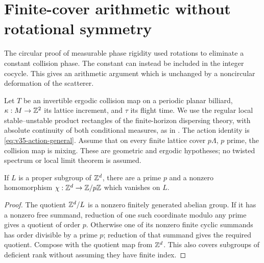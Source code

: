 \section{Finite-cover arithmetic without rotational symmetry}
\label{sec:rotation-free-arithmetic}
The circular proof of measurable phase rigidity used rotations to
eliminate a constant collision phase. The constant can instead be
included in the integer cocycle. This gives an arithmetic argument
which is unchanged by a noncircular deformation of the scatterer.

Let $T$ be an invertible ergodic collision map on a periodic planar
billiard, $\kappa:M\to\mathbb Z^2$ its lattice increment, and $\tau$ its flight
time. We use the regular local stable--unstable product rectangles
of the finite-horizon dispersing theory, with absolute continuity of
both conditional measures, as in \cite[Section 8]{Young}. The action
identity is \eqref{eq:v35-action-general}. Assume that on every finite
lattice cover $p\Lambda$, $p$ prime, the collision map is mixing.
These are geometric and ergodic hypotheses; no twisted spectrum or
local limit theorem is assumed.

\begin{lemma}
\label{lem:v35-finite-character}
If $L$ is a proper subgroup of $\mathbb Z^d$, there are a prime $p$ and a
nonzero homomorphism $\chi:\mathbb Z^d\to\mathbb Z/p\mathbb Z$ which vanishes on $L$.
\end{lemma}
\begin{proof}
The quotient $\mathbb Z^d/L$ is a nonzero finitely generated abelian group.
If it has a nonzero free summand, reduction of one such coordinate
modulo any prime gives a quotient of order $p$. Otherwise one of its
nonzero finite cyclic summands has order divisible by a prime $p$;
reduction of that summand gives the required quotient. Compose with
the quotient map from $\mathbb Z^d$. This also covers subgroups of deficient
rank without assuming they have finite index.
\end{proof}

